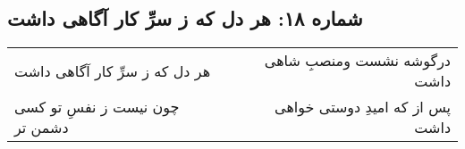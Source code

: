 \begin{center}
\section*{شماره ۱۸: هر دل که ز سرِّ کار آگاهی داشت}
\label{sec:018}
\begin{longtable}{l p{0.5cm} r}
هر دل که ز سرِّ کار آگاهی داشت
&&
درگوشه نشست ومنصبِ شاهی داشت
\\
چون نیست ز نفسِ تو کسی دشمن تر
&&
پس از که امیدِ دوستی خواهی داشت
\\
\end{longtable}
\end{center}
